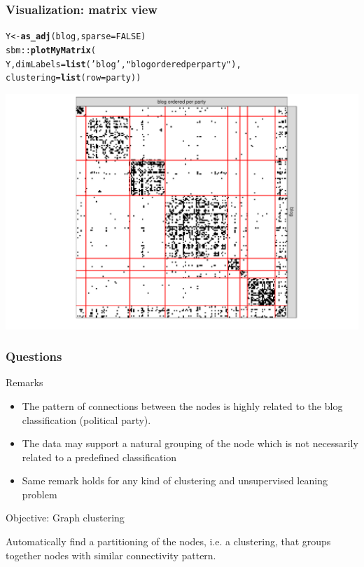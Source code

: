 \documentclass{beamer}\usepackage[]{graphicx}\usepackage[]{color}
\makeatletter
\newcommand{\hlnum}[1]{\textcolor[rgb]{0.686,0.059,0.569}{#1}}%
\newcommand{\hlstr}[1]{\textcolor[rgb]{0.192,0.494,0.8}{#1}}%
\newcommand{\hlopt}[1]{\textcolor[rgb]{0,0,0}{#1}}%
\newcommand{\hlstd}[1]{\textcolor[rgb]{0.345,0.345,0.345}{#1}}%
\newcommand{\hlkwb}[1]{\textcolor[rgb]{0.69,0.353,0.396}{#1}}%
\newcommand{\hlkwc}[1]{\textcolor[rgb]{0.333,0.667,0.333}{#1}}%
\newcommand{\hlkwd}[1]{\textcolor[rgb]{0.737,0.353,0.396}{\textbf{#1}}}%
\newenvironment{kframe}{%
 \def\at@end@of@kframe{}%
 \ifinner\ifhmode%
  \def\at@end@of@kframe{\end{minipage}}%
  \begin{minipage}{\columnwidth}%
 \fi\fi%
 \def\FrameCommand##1{\hskip\@totalleftmargin \hskip-\fboxsep
 \colorbox{shadecolor}{##1}\hskip-\fboxsep
     \hskip-\linewidth \hskip-\@totalleftmargin \hskip\columnwidth}%
 \MakeFramed {\advance\hsize-\width
   \@totalleftmargin\z@ \linewidth\hsize
   \@setminipage}}%
 {\par\unskip\endMakeFramed%
 \at@end@of@kframe}
\newenvironment{knitrout}{}{} %
\makeatother
\begin{document}
\begin{frame}[fragile]
  \frametitle{Visualization: matrix view}

\begin{knitrout}\scriptsize
{}\color{fgcolor}\begin{kframe}
\begin{alltt}
\hlstd{Y}  \hlkwb{<-} \hlkwd{as_adj}\hlstd{(blog,} \hlkwc{sparse} \hlstd{=} \hlnum{FALSE}\hlstd{)}
\hlstd{sbm}\hlopt{::}\hlkwd{plotMyMatrix}\hlstd{(}
  \hlstd{Y,} \hlkwc{dimLabels} \hlstd{=} \hlkwd{list}\hlstd{(}\hlstr{'blog'}\hlstd{,} \hlstr{"blog ordered per party"}\hlstd{),}
  \hlkwc{clustering} \hlstd{=} \hlkwd{list}\hlstd{(}\hlkwc{row} \hlstd{= party))}
\end{alltt}
\end{kframe}
\includegraphics[width=.8\textwidth]{figures/unnamed-chunk-1-1} 
\end{knitrout}

\end{frame}

\begin{frame}
  \frametitle{Questions}

\begin{block}{Remarks}  
  
  \begin{itemize}
  
  \item  The pattern of connections between the nodes is highly related to the blog classification (political party). 
  
  \item The data may support a natural grouping of the node which is not necessarily related to a predefined classification
  
  \item Same remark holds for any kind of clustering and unsupervised leaning problem

  \end{itemize}
\end{block}

  \vfill
  
\begin{block}{Objective: \alert{Graph clustering}}

  Automatically find a \alert{partitioning} of the nodes, i.e. a clustering, that groups together nodes with similar connectivity pattern.

\end{block}

\end{frame}
\end{document}
